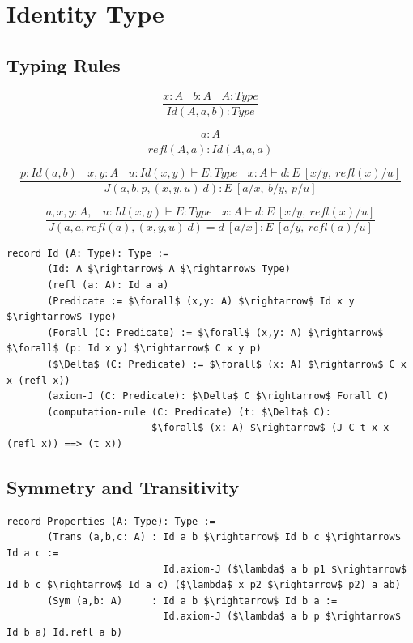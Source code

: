 \documentclass[11pt,oneside]{article}
\begin{document}
\section{Identity Type}

\subsection{Typing Rules}

\begin{equation}
\tag{$Id$-formation}
\dfrac
  {x:A\ \ \ \ b:A\ \ \ \ A:Type}
  {Id(A,a,b) : Type}
\end{equation}

\begin{equation}
\tag{$Id$-intro}
\dfrac
  {a:A}
  {refl(A,a) : Id(A,a,a) }
\end{equation}

\begin{equation}
\tag{$J$-elimination}
\dfrac
  {p:Id(a,b)\ \ \ \ x,y:A\ \ \ \ u:Id(x,y) \vdash E:Type\ \ \ \ x:A \vdash d: E\ [x/y,\ refl(x)/u]}
  {J(a,b,p,(x,y,u)\ d) : E\ [a/x,\ b/y,\ p/u]}
\end{equation}

\begin{equation}
\tag{$Id$-computation}
\dfrac
  {a,x,y:A,\ \ \ \ u:Id(x,y) \vdash E:Type\ \ \ \ x:A \vdash d:E\ [x/y,\ refl(x)/u]}
  {J(a,a,refl(a),(x,y,u)\ d) = d\ [a/x] : E\ [a/y,\ refl(a)/u]}
\end{equation}

\begin{lstlisting}[mathescape=true]
record Id (A: Type): Type :=
       (Id: A $\rightarrow$ A $\rightarrow$ Type)
       (refl (a: A): Id a a)
       (Predicate := $\forall$ (x,y: A) $\rightarrow$ Id x y $\rightarrow$ Type)
       (Forall (C: Predicate) := $\forall$ (x,y: A) $\rightarrow$ $\forall$ (p: Id x y) $\rightarrow$ C x y p)
       ($\Delta$ (C: Predicate) := $\forall$ (x: A) $\rightarrow$ C x x (refl x))
       (axiom-J (C: Predicate): $\Delta$ C $\rightarrow$ Forall C)
       (computation-rule (C: Predicate) (t: $\Delta$ C):
                         $\forall$ (x: A) $\rightarrow$ (J C t x x (refl x)) ==> (t x))
\end{lstlisting}

\subsection{Symmetry and Transitivity}

\begin{lstlisting}[mathescape=true]
record Properties (A: Type): Type :=
       (Trans (a,b,c: A) : Id a b $\rightarrow$ Id b c $\rightarrow$ Id a c :=
                           Id.axiom-J ($\lambda$ a b p1 $\rightarrow$ Id b c $\rightarrow$ Id a c) ($\lambda$ x p2 $\rightarrow$ p2) a ab)
       (Sym (a,b: A)     : Id a b $\rightarrow$ Id b a :=
                           Id.axiom-J ($\lambda$ a b p $\rightarrow$ Id b a) Id.refl a b)
\end{lstlisting}
\end{document}
